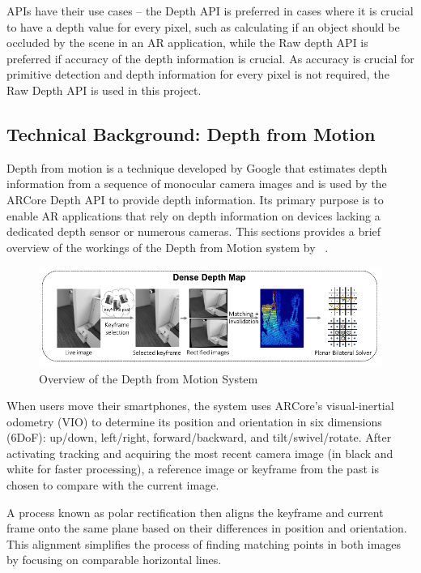 APIs have their use cases --
the Depth API is preferred in cases where it is crucial to have a depth value for every pixel, such as calculating if an object should be occluded by the scene in an AR application,
while the Raw depth API is preferred if accuracy of the depth information is crucial.
As accuracy is crucial for primitive detection and depth information for every pixel is not required, the Raw Depth API is used in this project.

\subsection{Technical Background: Depth from Motion}\label{sec:technical-background-depth-from-motion}
Depth from motion is a technique developed by Google that estimates depth information from a sequence of monocular camera images
and is used by the ARCore Depth API to provide depth information.
Its primary purpose is to enable AR applications that rely on depth information on devices lacking a dedicated depth sensor or numerous cameras.
This sections provides a brief overview of the workings of the Depth from Motion system by ~\parencite{valentin_depth_2018}.

\begin{figure}[ht!]
    \centering
    \includegraphics[width=\linewidth]{images/DepthFromMotion}
    \caption{Overview of the Depth from Motion System}
\end{figure}
When users move their smartphones, the system uses ARCore's visual-inertial odometry (VIO)
to determine its position and orientation in six dimensions (6DoF): up/down, left/right, forward/backward, and tilt/swivel/rotate.
After activating tracking and acquiring the most recent camera image (in black and white for faster processing),
a reference image or keyframe from the past is chosen to compare with the current image.

A process known as polar rectification then aligns the keyframe and current frame onto the same plane based on their differences in position and orientation.
This alignment simplifies the process of finding matching points in both images by focusing on comparable horizontal lines.


